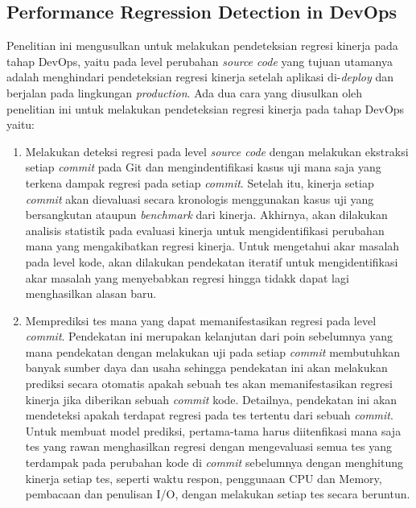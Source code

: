 \subsection{Performance Regression Detection in DevOps}
Penelitian ini \citep{regression-detection} mengusulkan untuk melakukan pendeteksian regresi kinerja pada tahap DevOps, yaitu pada level perubahan \textit{source code} yang tujuan utamanya adalah menghindari pendeteksian regresi kinerja setelah aplikasi di-\textit{deploy} dan berjalan pada lingkungan \textit{production}.
Ada dua cara yang diusulkan oleh penelitian ini untuk melakukan pendeteksian regresi kinerja pada tahap DevOps yaitu:
\begin{enumerate}
	\item Melakukan deteksi regresi pada level \textit{source code} dengan melakukan ekstraksi setiap \textit{commit} pada Git dan mengindentifikasi kasus uji mana saja yang terkena dampak regresi pada setiap \textit{commit}. Setelah itu, kinerja setiap \textit{commit} akan dievaluasi secara kronologis menggunakan kasus uji yang bersangkutan ataupun \textit{benchmark} dari kinerja. Akhirnya, akan dilakukan analisis statistik pada evaluasi kinerja untuk mengidentifikasi perubahan mana yang mengakibatkan regresi kinerja. Untuk mengetahui akar masalah pada level kode, akan dilakukan pendekatan iteratif untuk mengidentifikasi akar masalah yang menyebabkan regresi hingga tidakk dapat lagi menghasilkan alasan baru.
	\item Memprediksi tes mana yang dapat memanifestasikan regresi pada level \textit{commit}. Pendekatan ini merupakan kelanjutan dari poin sebelumnya yang mana pendekatan dengan melakukan uji pada setiap \textit{commit} membutuhkan banyak sumber daya dan usaha sehingga pendekatan ini akan melakukan prediksi secara otomatis apakah sebuah tes akan memanifestasikan regresi kinerja jika diberikan sebuah \textit{commit} kode. Detailnya, pendekatan ini akan mendeteksi apakah terdapat regresi pada tes tertentu dari sebuah \textit{commit}. Untuk membuat model prediksi, pertama-tama harus diitenfikasi mana saja tes yang rawan menghasilkan regresi dengan mengevaluasi semua tes yang terdampak pada perubahan kode di \textit{commit} sebelumnya dengan menghitung kinerja setiap tes, seperti waktu respon, penggunaan CPU dan Memory, pembacaan dan penulisan I/O, dengan melakukan setiap tes secara beruntun.
\end{enumerate}
 
